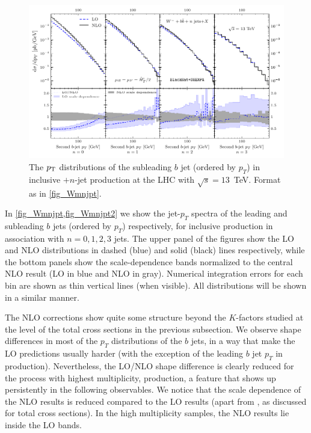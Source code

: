 \begin{figure}[ht]
  \centering
  \includegraphics[clip,scale=1]{plots/ptsubleading}
  \caption{The $p_{\textrm T}$ distributions of the subleading $b$ jet (ordered by $p_T$) in inclusive \Wbbm$+n$-jet
    production at the LHC with $\sqrt{s}=13$~TeV. Format as in \cref{fig_Wmnjpt}.}
    \label{fig_Wmnjpt2}
  \end{figure}

In \cref{fig_Wmnjpt,fig_Wmnjpt2} we show the jet-$p_T$ spectra of the leading
and subleading $b$ jets (ordered by $p_T$) respectively, for inclusive
\Wbbm{} production in association with $n=0,1,2,3$ jets. The upper panel
of the
figures show the LO and NLO distributions in dashed (blue) and solid (black)
lines respectively, while the bottom panels show the scale-dependence bands
normalized to the central NLO result (LO in blue and NLO in gray). Numerical
integration errors for each bin are shown as thin vertical lines (when visible).
All distributions will be shown in a similar manner.

The NLO corrections show quite some structure beyond the $K$-factors studied at
the level of the total cross sections in the previous subsection. We
observe shape differences in most of the $p_T$ distributions of the $b$ jets, in a way
that make the LO predictions usually harder (with the exception of the leading
$b$ jet $p_T$ in \Wbb{} production). Nevertheless, the LO/NLO shape difference
is clearly reduced for the process with highest multiplicity, \Wbbjjj{} production, a
feature that shows up persistently in the following observables.
We notice that the scale dependence of the NLO
results is reduced compared to the LO results (apart from \Wbb{}, as
discussed for total cross sections). In the high multiplicity samples, the NLO results
lie inside the LO bands. 

